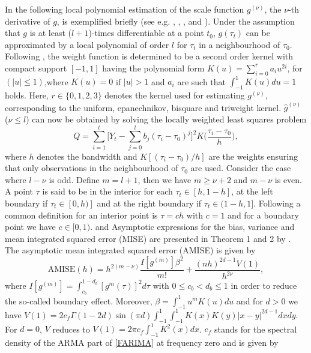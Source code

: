 \documentclass[12pt]{article}
\begin{document}
In the following local polynomial estimation of the scale function $g^{(\nu)}$, the $\nu$-th derivative of $g$, is exemplified briefly (see e.g. \cite{beran2002iterative}, \cite{beran2002local}, \cite{beran2002semifar}, and \cite{beran2013limit}). Under the assumption that $g$ is at least ($l+1$)-times differentiable at a point $t_0$, $g(\tau_t)$ can be approximated by a local polynomial of order $l$ for $\tau_t$ in a neighbourhood of $\tau_0$. Following \citet{gasser1979kernel}, the weight function is determined to be a second order kernel with compact support $[-1,1]$ having the polynomial form $K(u)=\sum_{i=0}^{r}a_i u^{2i}$, for $(|u|\leq1)$,where $K(u)=0$ if $|u|>1$ and $a_i$ are such that $\int_{-1}^{1}K(u)du=1$ holds.  Here, $r \in \{0,1,2,3\}$ denotes the kernel used for estimating $g^{(\nu)}$, corresponding to the uniform, epanechnikov, bisquare and triweight kernel.
$\hat{g}^{(\nu)}$ ($\nu\leq l$) can now be obtained by solving the locally weighted least squares problem
\begin{equation}
\label{LP}
Q=\sum_{i=1}^{t}\Bigg[Y_t-\sum_{j=0}^{l}b_j(\tau_i-\tau_0)^j\Bigg]^2 K\Big(\frac{\tau_i-\tau_0}{h}\Big),	
\end{equation}
where $h$ denotes the bandwidth and $K[(\tau_i-\tau_0)/h]$ are the weights ensuring that only observations in the neighbourhood of $\tau_0$ are used. Consider the case where $l-\nu$ is odd. Define $m=l+1$, then we have $m \geq \nu + 2$ and $m-\nu$ is even. A point $\tau$ is said to be in the interior for each $\tau_t\in [h,1-h]$, at the left boundary if $\tau_t\in [0,h)]$ and at the right boundary if $\tau_t\in (1-h,1]$. Following \citet{beran2002local} a common definition for an interior point is $\tau=ch$ with $c=1$ and for a boundary point we have $c \in [0,1)$.   
\citet{beran2002iterative} and \citet{beran2002local}  Asymptotic expressions for the bias, variance and mean integrated squared error (MISE) are presented in Theorem 1 and 2 by \citet{beran2002local}. The asymptotic mean integrated squared error (AMISE) is given by
\begin{equation}
	\label{AMISE}
	\text{AMISE}(h) = h^{2(m-\nu)} \frac{I[g^{(m)}]\beta^2}{m!} + \frac{(nh)^{2d-1}V(1)}{h^{2\nu}},
\end{equation}
where $I[g^{(m)}] = \int_{c_b}^{1-d_b}[g^{m}(\tau)]^2d\tau$ with $0 \leq c_b < d_b \leq 1$ in order to reduce the so-called boundary effect. Moreover, $\beta = \int_{-1}^{1}u^mK(u)du$ and for $d > 0 $ we have $V(1)=2c_f \Gamma(1-2d)\sin (\pi d) \int_{-1}^{1} \int_{-1}^{1} K(x)K(y)|x-y|^{2d-1}dxdy$. For $d = 0$, $V$ reduces to $V(1)=2\pi c_f \int_{-1}^{1}K^2(x)dx$. $c_f$ stands for the spectral density of the ARMA part of \eqref{FARIMA} at frequency zero and is given by 
\end{document}
